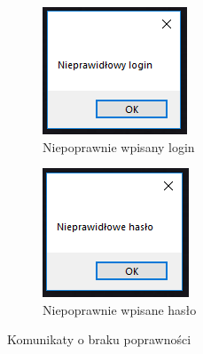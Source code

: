 \documentclass{article}
\begin{document}
\begin{figure}[!ht]
\centering
  \begin{subfigure}[b]{0.3\textwidth}
  \includegraphics[width=\textwidth]{login.PNG}
  \caption{Niepoprawnie wpisany login}
  \end{subfigure}
  \begin{subfigure}[b]{0.3\textwidth}
  \includegraphics[width=\textwidth]{haslo.PNG}
  \caption{Niepoprawnie wpisane hasło}
  \end{subfigure}
  \caption{Komunikaty o braku poprawności}
\end{figure}
\newpage
\end{document}
